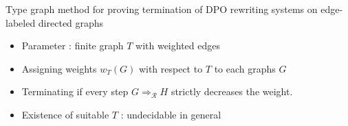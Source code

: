 \documentclass{beamer}
\newcommand{\graphbox}[8]{
  \begin{scope}[xshift=#2,yshift=#3]
    \draw [rounded corners=2mm] (0,0) rectangle (#4,-#5);
    \node at (0,0mm) [anchor=north west,inner sep=1mm] {#1};
    \begin{scope}[xshift=#4/2+#6,yshift=#7] 
    #8
    \end{scope}
  \end{scope}
}
\begin{document}

\begin{frame}{Type graph method for proving termination of DPO rewriting systems on edge-labeled directed graphs}

    \begin{itemize}
      \item Parameter : finite graph \( T \) with weighted edges
      \item Assigning weights $w_T(G)$ with respect to $T$ to each graphs $G$
      \item \alert{Terminating} if every step $G \Rightarrow_\mathcal{R} H$ strictly decreases the weight.
      \item \alert{Existence} of suitable $T$ : \alert{undecidable} in general
    \end{itemize}

    
     



\end{frame}
\end{document}
